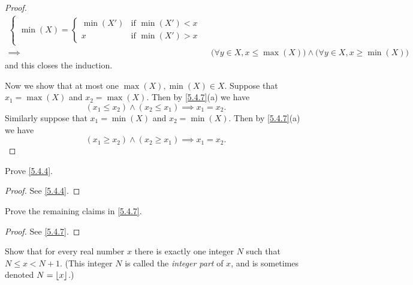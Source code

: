 \begin{proof}
\begin{align*}
\begin{cases}
                 \min(X) = \begin{cases}
                  \min(X') & \text{if } \min(X') < x \\
                  x        & \text{if } \min(X') > x
                \end{cases}
               \end{cases}                                                                                         \\
    \implies & \big(\forall y \in X, x \leq \max(X)\big) \land \big(\forall y \in X, x \geq \min(X)\big)
  \end{align*}
  and this closes the induction.

  Now we show that at most one \(\max(X), \min(X) \in X\).
  Suppose that \(x_1 = \max(X)\) and \(x_2 = \max(X)\).
  Then by \cref{5.4.7}(a) we have
  \[
    (x_1 \leq x_2) \land (x_2 \leq x_1) \implies x_1 = x_2.
  \]
  Similarly suppose that \(x_1 = \min(X)\) and \(x_2 = \min(X)\).
  Then by \cref{5.4.7}(a) we have
  \[
    (x_1 \geq x_2) \land (x_2 \geq x_1) \implies x_1 = x_2.
  \]
\end{proof}

\exercisesection

\begin{exercise}\label{ex 5.4.1}
  Prove \cref{5.4.4}.
\end{exercise}

\begin{proof}
  See \cref{5.4.4}.
\end{proof}

\begin{exercise}\label{ex 5.4.2}
  Prove the remaining claims in \cref{5.4.7}.
\end{exercise}

\begin{proof}
  See \cref{5.4.7}.
\end{proof}

\begin{exercise}\label{ex 5.4.3}
  Show that for every real number \(x\) there is exactly one integer \(N\) such that \(N \leq x < N + 1\).
  (This integer \(N\) is called the \emph{integer part} of \(x\), and is sometimes denoted \(N = \left\lfloor x\right\rfloor\).)
\end{exercise}

